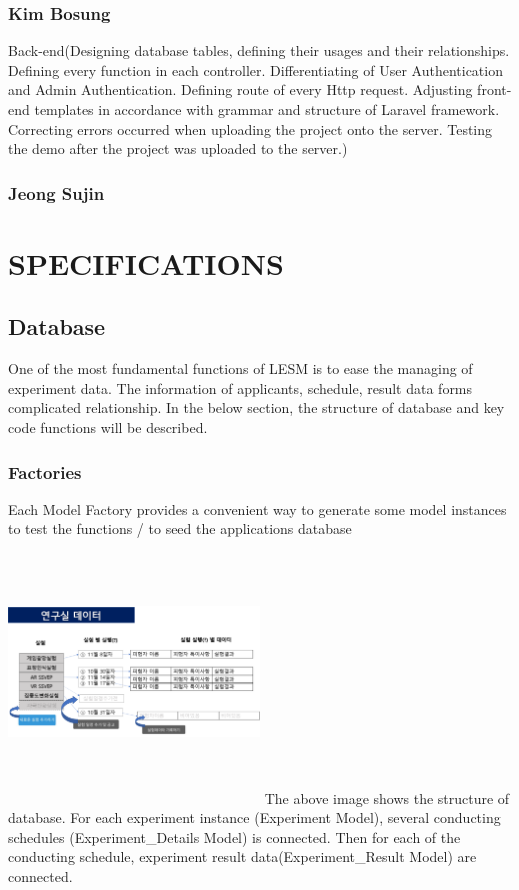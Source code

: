\documentclass[letterpaper, 10 pt, conference]{ieeeconf}  %
\begin{document}
\subsubsection{Kim Bosung}
Back-end(Designing database tables, defining their usages and their relationships. Defining every function in each controller. Differentiating of User Authentication and Admin Authentication. Defining route of every Http request. Adjusting front-end templates in accordance with grammar and structure of Laravel framework. Correcting errors occurred when uploading the project onto the server. Testing the demo after the project was uploaded to the server.)\\
\subsubsection{Jeong Sujin}


\section{SPECIFICATIONS}

\subsection{Database} %
One of the most fundamental functions of LESM is to ease the managing of experiment data. The information of applicants, schedule, result data forms complicated relationship. In the below section, the structure of database and key code functions will be described.
\subsubsection{Factories\\}
Each Model Factory provides a convenient way to generate some model instances to test the functions / to seed the applications database\\

\includegraphics[width=0.5\textwidth,height = 7cm]{Oven/14_structureOfExperimentData.png}
The above image shows the structure of database. For each experiment instance (Experiment Model), several conducting schedules (Experiment\_Details Model)  is connected. Then for each of the conducting schedule, experiment result data(Experiment\_Result Model) are connected. \\
\end{document}
